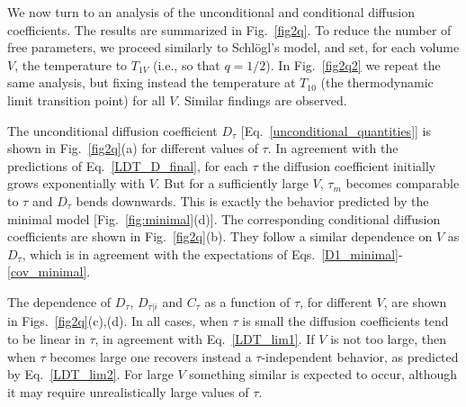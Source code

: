 \documentclass[aps,pre,reprint, amsmath, amssymb,superscriptaddress]{revtex4-1}
\begin{document}

We now turn to an analysis of the unconditional and conditional diffusion coefficients. 
The results are summarized in Fig.~\ref{fig2q}.
To reduce the number of free parameters, we proceed similarly to Schl\"ogl's model, and set, for each volume $V$, the temperature to $T_{1V}$ (i.e., so that $q=1/2$).
In Fig.~\ref{fig2q2} we repeat the same analysis, but fixing instead the temperature at $T_{10}$ (the thermodynamic limit transition point) for all $V$.
Similar findings are observed. 

The unconditional diffusion coefficient $D_\tau$ [Eq.~\eqref{unconditional_quantities}] is shown in Fig.~\ref{fig2q}(a) for different values of $\tau$. 
In agreement with the predictions of Eq.~\eqref{LDT_D_final}, for each $\tau$ the diffusion coefficient initially grows exponentially with $V$. But for a sufficiently large $V$, $\tau_m$ becomes comparable to $\tau$ and $D_\tau$ bends downwards.
This is exactly the behavior predicted by the minimal model [Fig.~\ref{fig:minimal}(d)].
The corresponding conditional diffusion coefficients are shown in Fig.~\ref{fig2q}(b). 
They follow a similar dependence on $V$ as $D_\tau$, which is in agreement with the expectations of Eqs.~\eqref{D1_minimal}-\eqref{cov_minimal}. 

The dependence of $D_\tau$, $D_{\tau|i}$ and $C_\tau$ as a function of $\tau$, for different $V$, are shown in Figs.~\ref{fig2q}(c),(d). 
In all cases, when $\tau$ is small the diffusion coefficients tend to be linear in $\tau$, in agreement with Eq.~\eqref{LDT_lim1}. 
If $V$ is not too large, then when $\tau$ becomes large one recovers instead a $\tau$-independent behavior, as predicted by Eq.~\eqref{LDT_lim2}. 
For large $V$ something similar is expected to occur, although it may require unrealistically large values of $\tau$. 
\end{document}
